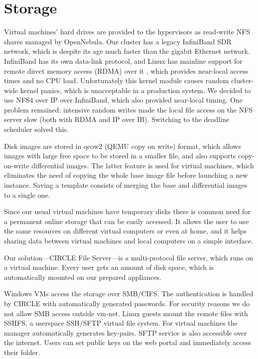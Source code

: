\documentclass{llncs}
\begin{document}
\section{Storage}
Virtual machines' hard drives are provided to the hypervisors as read-write NFS shares managed by OpenNebula. Our cluster has a legacy InfiniBand SDR network, which is despite its age much faster than the gigabit Ethernet network. InfiniBand has its own data-link protocol, and Linux has mainline support for remote direct memory access (RDMA) over it , which provides near-local access times and no CPU load.\cite{callaghan2002nfs} Unfortunately this kernel module causes random cluster-wide kernel panics, which is unacceptable in a production system. We decided to use NFS4 over IP over InfiniBand, which also provided near-local timing. One problem remained: intensive random writes made the local file access on the NFS server slow (both with RDMA and IP over IB). Switching to the deadline scheduler solved this.

Disk images are stored in qcow2 (QEMU copy on write) format, which allows images with large free space to be stored in a smaller file, and also supports copy-on-write differential images. The latter feature is used for virtual machines, which eliminates the need of copying the whole base image file before launching a new instance. Saving a template consists of merging the base and differential images to a single one.

Since our usual virtual machines have temporary disks there is common need for a permanent online storage that can be easily accessed. It allows the user to use the same resources on different virtual computers or even at home, and it helps sharing data between virtual machines and local computers on a simple interface.

Our solution---CIRCLE File Server---is a multi-protocol file server, which runs on a virtual machine. Every user gets an amount of disk space, which is automatically mounted on our prepared appliances.

Windows VMs access the storage over SMB/CIFS. The authentication is handled by CIRCLE with automatically generated passwords. For security reasons we do not allow SMB access outside vm-net.
Linux guests mount the remote files with SSHFS\cite{hoskins2006sshfs}, a userspace SSH/SFTP virtual file system. For virtual machines the manager automatically generates key-pairs. SFTP service is also accessible over the internet. Users can set public keys on the web portal and immediately access their folder.
\end{document}
